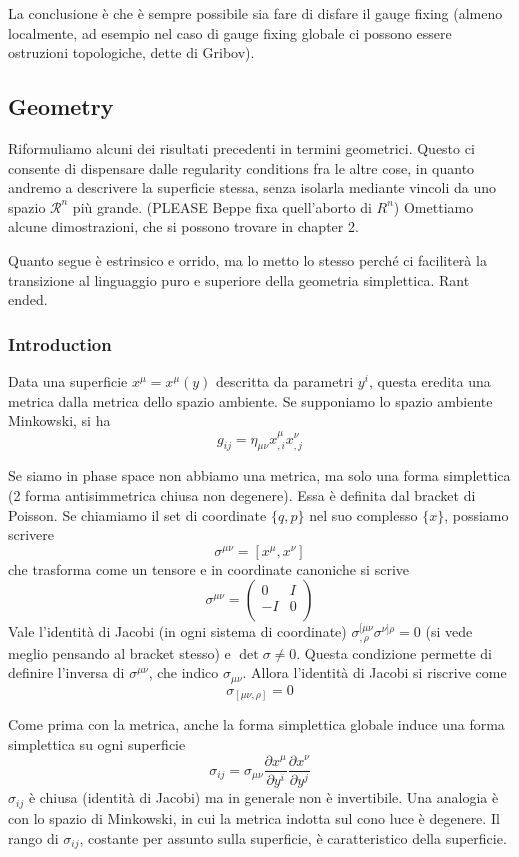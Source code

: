 \documentclass[a4paper, 11pt]{article}
\newcommand{\pderiv}[2]{\dfrac{\partial #1}{\partial #2}}
\begin{document}
	La conclusione è che è sempre possibile sia fare di disfare il gauge fixing (almeno localmente, ad esempio nel caso di gauge fixing globale ci possono essere ostruzioni topologiche, dette di Gribov).
	
	\subsection{Geometry}
	Riformuliamo alcuni dei risultati precedenti in termini geometrici. Questo ci consente di dispensare dalle regularity conditions fra le altre cose, in quanto andremo a descrivere la superficie stessa, senza isolarla mediante vincoli da uno spazio $\mathcal{R}^n$ più grande. (PLEASE Beppe fixa quell'aborto di $R^n$)%
	Omettiamo alcune dimostrazioni, che si possono trovare in \cite{HT} chapter 2.
	
	Quanto segue è estrinsico e orrido, ma lo metto lo stesso perché ci faciliterà la transizione al linguaggio puro e superiore della geometria simplettica. Rant ended.
	
	\subsubsection{Introduction}
	Data una superficie $x^\mu = x^\mu(y)$ descritta da parametri $y^i$, questa eredita una metrica dalla metrica dello spazio ambiente. Se supponiamo lo spazio ambiente Minkowski, si ha
	\[ g_{ij} = \eta_{\mu\nu} x^\mu_{,i} x^\nu_{,j} \]
	
	Se siamo in phase space non abbiamo una metrica, ma solo una forma simplettica (2 forma antisimmetrica chiusa non degenere). Essa è definita dal bracket di Poisson. Se chiamiamo il set di coordinate $\{q,p\}$ nel suo complesso $\{x\}$, possiamo scrivere
	\[ \sigma^{\mu\nu} = [x^\mu, x^\nu] \]
	che trasforma come un tensore e in coordinate canoniche si scrive
	\[ \sigma^{\mu\nu} = \begin{pmatrix}
	0 & I \\
	-I & 0 \\
	\end{pmatrix}  \]
	Vale l'identità di Jacobi (in ogni sistema di coordinate) $\sigma^{[\mu\nu}_{,\rho} \sigma^{\nu]\rho} = 0$ (si vede meglio pensando al bracket stesso) e $\det\sigma\neq 0$. Questa condizione permette di definire l'inversa di $\sigma^{\mu\nu}$, che indico $\sigma_{\mu\nu}$. Allora l'identità di Jacobi si riscrive come
	\[ \sigma_{[\mu\nu,\rho]}  = 0\]
	
	Come prima con la metrica, anche la forma simplettica globale induce una forma simplettica su ogni superficie
	\[ \sigma_{ij} = \sigma_{\mu\nu} \pderiv{x^\mu}{y^i} \pderiv{x^\nu}{y^j} \]
	$\sigma_{ij}$ è chiusa (identità di Jacobi) ma in generale non è invertibile. Una analogia è con lo spazio di Minkowski, in cui la metrica indotta sul cono luce è degenere. Il rango di $\sigma_{ij}$, costante per assunto sulla superficie, è caratteristico della superficie.
	
\end{document}
